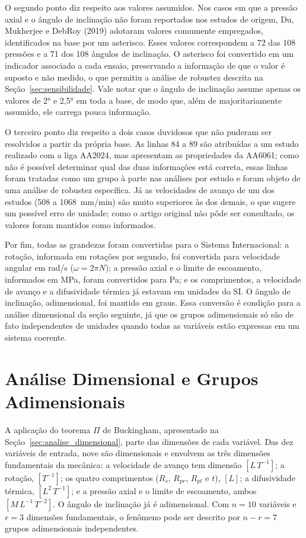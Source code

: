 \documentclass[12pt,openany]{report}
\begin{document}
O segundo ponto diz respeito aos valores assumidos. Nos casos em que a pressão axial e o ângulo de inclinação não foram reportados nos estudos de origem, Du, Mukherjee e DebRoy (2019) adotaram valores comumente empregados, identificados na base por um asterisco. Esses valores correspondem a 72 das 108 pressões e a 71 dos 108 ângulos de inclinação. O asterisco foi convertido em um indicador associado a cada ensaio, preservando a informação de que o valor é suposto e não medido, o que permitiu a análise de robustez descrita na Seção~\ref{sec:sensibilidade}. Vale notar que o ângulo de inclinação assume apenas os valores de 2° e 2,5° em toda a base, de modo que, além de majoritariamente assumido, ele carrega pouca informação.

O terceiro ponto diz respeito a dois casos duvidosos que não puderam ser resolvidos a partir da própria base. As linhas 84 a 89 são atribuídas a um estudo realizado com a liga AA2024, mas apresentam as propriedades da AA6061; como não é possível determinar qual das duas informações está correta, essas linhas foram tratadas como um grupo à parte nas análises por estudo e foram objeto de uma análise de robustez específica. Já as velocidades de avanço de um dos estudos (508 a 1068~mm/min) são muito superiores às dos demais, o que sugere um possível erro de unidade; como o artigo original não pôde ser consultado, os valores foram mantidos como informados.

Por fim, todas as grandezas foram convertidas para o Sistema Internacional: a rotação, informada em rotações por segundo, foi convertida para velocidade angular em rad/s ($\omega = 2\pi N$); a pressão axial e o limite de escoamento, informados em MPa, foram convertidos para Pa; e os comprimentos, a velocidade de avanço e a difusividade térmica já estavam em unidades do SI. O ângulo de inclinação, adimensional, foi mantido em graus. Essa conversão é condição para a análise dimensional da seção seguinte, já que os grupos adimensionais só são de fato independentes de unidades quando todas as variáveis estão expressas em um sistema coerente.

\section{Análise Dimensional e Grupos Adimensionais}
\label{sec:grupos}

A aplicação do teorema $\Pi$ de Buckingham, apresentado na Seção~\ref{sec:analise_dimensional}, parte das dimensões de cada variável. Das dez variáveis de entrada, nove são dimensionais e envolvem as três dimensões fundamentais da mecânica: a velocidade de avanço tem dimensão $[L\,T^{-1}]$; a rotação, $[T^{-1}]$; os quatro comprimentos ($R_s$, $R_{pr}$, $R_{pt}$ e $t$), $[L]$; a difusividade térmica, $[L^{2}\,T^{-1}]$; e a pressão axial e o limite de escoamento, ambos $[M\,L^{-1}\,T^{-2}]$. O ângulo de inclinação já é adimensional. Com $n = 10$ variáveis e $r = 3$ dimensões fundamentais, o fenômeno pode ser descrito por $n - r = 7$ grupos adimensionais independentes.
\end{document}
